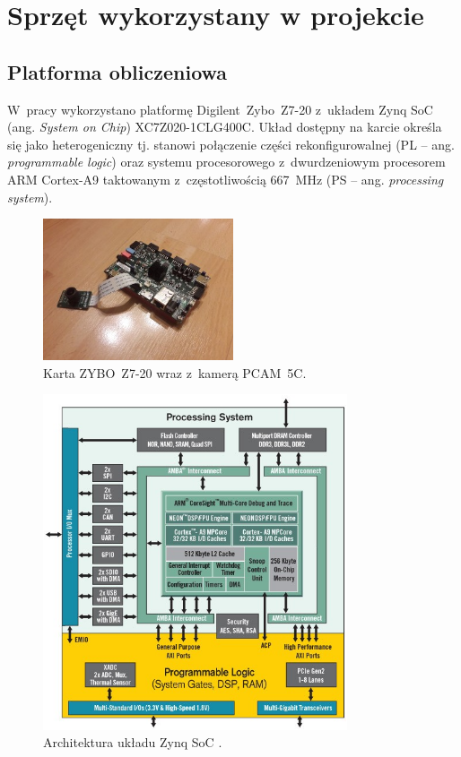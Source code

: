 \chapter{Sprzęt wykorzystany w projekcie}
\label{cha:sprzet}


\section{Platforma obliczeniowa}
\label{sec:platforma_obliczeniowa}

W~pracy wykorzystano platformę Digilent~Zybo~Z7-20 z~układem Zynq SoC (ang. \textit{System on Chip}) XC7Z020-1CLG400C. 
Układ dostępny na karcie określa się jako heterogeniczny tj. stanowi połączenie części rekonfigurowalnej (PL -- ang. \textit{programmable logic}) oraz systemu procesorowego z~dwurdzeniowym procesorem ARM Cortex-A9 taktowanym z~częstotliwością 667~MHz (PS -- ang. \textit{processing system}).
\begin{figure}[h]
	\centering
	\includegraphics[width=0.5\textwidth]{plytka_kamera.jpg}
	\caption{Karta ZYBO~Z7-20 wraz z~kamerą PCAM~5C.}
	\label{fig:plytka_kamera}
\end{figure}
\begin{figure}[h]
	\centering
	\includegraphics[width=0.8\textwidth]{zynq.png}
	\caption{Architektura układu Zynq SoC \cite{zynq}.}
	\label{fig:zynq}
\end{figure}
